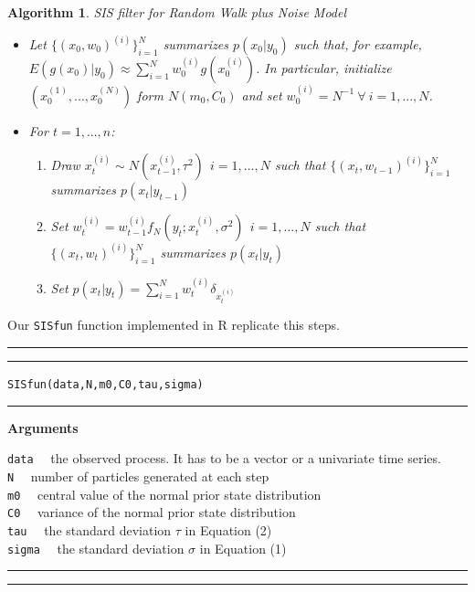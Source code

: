 \documentclass[
]{book}
\theoremstyle{break}
\theoremstyle{nonumberplain}
\newtheorem{algorithm}{Algorithm}[section]
\begin{document}
\begin{algorithm} SIS filter for Random Walk plus Noise Model
\begin{itemize}
\item Let $\{(x_{0},w_{0})^{(i)}\}_{i=1}^{N}$ summarizes $p(x_{0}|y_{0})$ such that, for example, $E(g(x_{0})|y_{0}) \approx \sum_{i=1}^{N}w_{0}^{(i)}g(x_{0}^{(i)})$. In particular, initialize $(x_{0}^{(1)},...,x_{0}^{(N)})$ form $N(m_{0},C_{0})$ and set $w_{0}^{(i)}=N^{-1} \ \forall \ i=1,...,N$.
\item For $t=1,...,n$:
\begin{enumerate}
\item Draw $x_{t}^{(i)} \sim N(x_{t-1}^{(i)},\tau^2) \ \ i=1,...,N$ such that $\{(x_{t},w_{t-1})^{(i)}\}_{i=1}^{N}$ summarizes $p(x_{t}|y_{t-1})$
\item Set $w_{t}^{(i)} = w_{t-1}^{(i)}f_{N}(y_{t};x_{t}^{(i)},\sigma^2) \ \ i=1,...,N$ such that $\{(x_{t},w_{t})^{(i)}\}_{i=1}^{N}$ summarizes $p(x_{t}|y_{t})$
\item Set $p(x_{t}|y_{t})=\sum_{i=1}^{N}w_{t}^{(i)}\delta_{x_{t}^{(i)}}$
\end{enumerate}
\end{itemize}
\end{algorithm}

Our \texttt{SISfun} function implemented in R replicate this steps.\\

\hrule
\hrule

\hfill\break
\texttt{SISfun(data,N,m0,C0,tau,sigma)}\\

\hrule

\textbf{Arguments}

\texttt{data} ~~the observed process. It has to be a vector or a
univariate time series.\\
\texttt{N} ~~number of particles generated at each step\\
\texttt{m0} ~~central value of the normal prior state distribution\\
\texttt{C0} ~~variance of the normal prior state distribution\\
\texttt{tau} ~~the standard deviation \(\tau\) in Equation (2)\\
\texttt{sigma} ~~the standard deviation \(\sigma\) in Equation (1)

\hrule
\hrule
\end{document}
